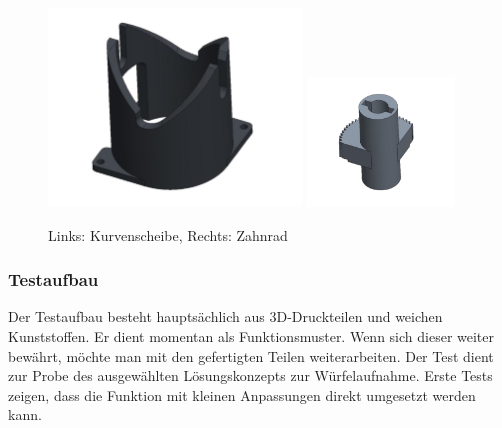 \documentclass[../../main.tex]{subfiles}
\begin{document}
        \begin{figure}[H]
            \centering
            \includegraphics[width=0.6\textwidth]{../../images/Kran/Kurvenscheibe_3.JPG}
            \includegraphics[width=0.35\textwidth]{../../images/Kran/Zahnrad_3.JPG}
            \caption {Links: Kurvenscheibe,  Rechts: Zahnrad}
        \end{figure}
        \pagebreak


        \subsubsection{Testaufbau}
        Der Testaufbau besteht hauptsächlich aus 3D-Druckteilen und weichen Kunststoffen. Er dient momentan als Funktionsmuster. Wenn sich dieser weiter bewährt, möchte man mit den gefertigten Teilen weiterarbeiten. Der Test dient zur Probe des ausgewählten Lösungskonzepts zur Würfelaufnahme. Erste Tests zeigen, dass die Funktion mit kleinen Anpassungen direkt umgesetzt werden kann.
\end{document}
